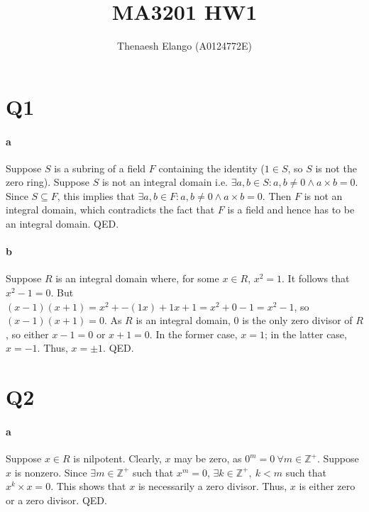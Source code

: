 \documentclass[]{article}
\title{MA3201 HW1}
\author{Thenaesh Elango (A0124772E)}
\begin{document}
\maketitle


\section*{Q1}
	\paragraph{a}
	Suppose $S$ is a subring of a field $F$ containing the identity ($1 \in S$, so $S$ is not the zero ring).\newline
	Suppose $S$ is not an integral domain i.e. $\exists a,b \in S: a,b \not= 0 \wedge a \times b = 0$.\newline
	Since $S \subseteq F$, this implies that $\exists a,b \in F: a,b \not= 0 \wedge a \times b = 0$.\newline
	Then $F$ is not an integral domain, which contradicts the fact that $F$ is a field and hence has to be an integral domain. QED.
	\paragraph{b}
	Suppose $R$ is an integral domain where, for some $x \in R$, $x^2 = 1$.\newline
	It follows that $x^2 - 1 = 0$.\newline
	But $(x - 1)(x + 1) = x^2 + -(1x) + 1x + 1 = x^2 + 0 - 1 = x^2 - 1$, so $(x - 1)(x + 1) = 0$.\newline
	As $R$ is an integral domain, $0$ is the only zero divisor of $R$, so either $x - 1 = 0$ or $x + 1 = 0$.\newline
	In the former case, $x = 1$; in the latter case, $x = -1$.\newline
	Thus, $x = \pm 1$. QED.

\section*{Q2}
	\paragraph{a}
	Suppose $x \in R$ is nilpotent.\newline
	Clearly, $x$ may be zero, as $0^m = 0 \ \forall m \in \mathbb{Z}^+$.\newline
	Suppose $x$ is nonzero. Since $\exists m \in \mathbb{Z}^+$ such that $x^m = 0$, $\exists k \in \mathbb{Z}^+,\ k < m$ such that $x^k \times x = 0$. This shows that $x$ is necessarily a zero divisor.\newline
	Thus, $x$ is either zero or a zero divisor. QED.
\end{document}
